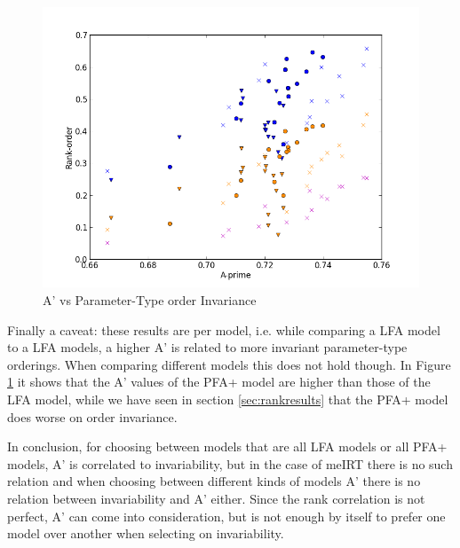 \documentclass{scrartcl}
\begin{document}
\begin{figure}[h]
\centering
\includegraphics[width=140mm]{images/allaprimes.png}
\caption{A' vs Parameter-Type order Invariance}
\label{fig:ap}
\end{figure}

Finally a caveat: these results are per model, i.e. while comparing a LFA model to a LFA models, a higher A' is related to more invariant parameter-type orderings. When comparing different models this does not hold though. In Figure \ref{fig:ap} it shows that the A' values of the PFA+ model are higher than those of the LFA model, while we have seen in section \ref{sec:rankresults} that the PFA+ model does worse on order invariance. 

In conclusion, for choosing between models that are all LFA models or all PFA+ models, A' is correlated to invariability, but in the case of meIRT there is no such relation and when choosing between different kinds of models A' there is no relation between invariability and A' either. Since the rank correlation is not perfect, A' can come into consideration, but is not enough by itself to prefer one model over another when selecting on invariability.
\end{document}
